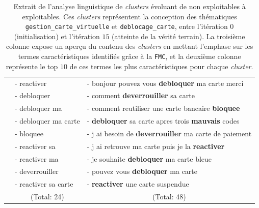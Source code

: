 \begin{table}[!htb]
\begin{center}
\begin{tabular}{|c|l|l|}
						& { \scriptsize - reactiver }
						& { \scriptsize - bonjour pouvez vous \textbf{debloquer} ma carte merci }
						\tabularnewline
						
						& { \scriptsize - debloquer }
						& { \scriptsize - comment \textbf{deverrouiller} sa carte }
						\tabularnewline
						
						& { \scriptsize - debloquer ma }
						& { \scriptsize - comment reutiliser une carte bancaire \textbf{bloquee} }
						\tabularnewline
						
						& { \scriptsize - debloquer ma carte }
						& { \scriptsize - \textbf{debloquer} sa carte apres trois \textbf{mauvais} codes }
						\tabularnewline
						
						& { \scriptsize - bloquee }
						& { \scriptsize - j ai besoin de \textbf{deverrouiller} ma carte de paiement }
						\tabularnewline
						
						& { \scriptsize - reactiver sa }
						& { \scriptsize - j ai retrouve ma carte puis je la \textbf{reactiver} }
						\tabularnewline
						
						& { \scriptsize - reactiver ma }
						& { \scriptsize - je souhaite \textbf{debloquer} ma carte bleue }
						\tabularnewline
						
						& { \scriptsize - deverrouiller }
						& { \scriptsize - pouvez vous \textbf{debloquer} ma carte }
						\tabularnewline
						
						& { \scriptsize - reactiver sa carte }
						& { \scriptsize - \textbf{reactiver} une carte suspendue }
						\tabularnewline
						
						& \multicolumn{1}{c|}{
							\scriptsize (Total: 24)
						}
						& \multicolumn{1}{c|}{
							\scriptsize (Total: 48)
						}
						\tabularnewline
						\hline
					
				\end{tabular}
				\end{center}
				\caption{
					Extrait de l'analyse linguistique de \textit{clusters} évoluant de non exploitables à exploitables.
					Ces \textit{clusters} représentent la conception des thématiques \texttt{gestion\_carte\_virtuelle} et \texttt{deblocage\_carte}, entre l'itération $0$ (initialisation) et l'itération $15$ (atteinte de la vérité terrain).
					La troisième colonne expose un aperçu du contenu des \textit{clusters} en mettant l'emphase sur les termes caractéristiques identifiés grâce à la \texttt{FMC}, et la deuxième colonne représente le top $10$ de ces termes les plus caractéristiques pour chaque \textit{cluster}.
				}
				\label{table:4.4.2-ETUDE-PERTINENCE-PATTERNS-LINGUISTIQUES-DEBLOCAGE-CARTE-GESTION-CARTE-VIRTUELLE}
			\end{table}

